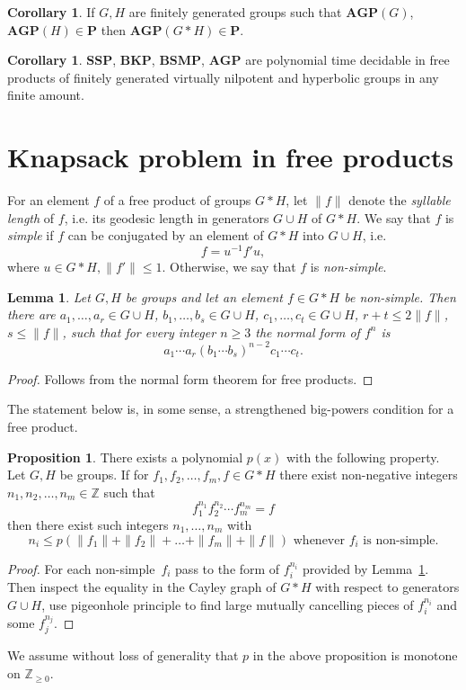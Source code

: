\documentclass[10pt]{amsart}
\newtheorem{lemma}[theorem]{Lemma}
\theoremstyle{definition}
\newtheorem{proposition}[theorem]{Proposition}
\newtheorem{corollary}[theorem]{Corollary}
\def\P{{\mathbf{P}}}
\def\SSP{{\mathbf{SSP}}}
\def\BSMP{{\mathbf{BSMP}}}
\def\BKP{{\mathbf{BKP}}}
\def\AGP{{\mathbf{AGP}}}
\def\dumb{simple} %
\def\nondumb{non-simple} %
\begin{document}
\begin{corollary}\label{cor:ptime_agp}
If $G,H$ are finitely generated groups such that $\AGP(G)$, $\AGP(H)\in\P$ then $\AGP(G*H)\in\P$.
\end{corollary}


\begin{corollary}
$\SSP$, $\BKP$, $\BSMP$, $\AGP$ are polynomial time decidable in free products of finitely generated virtually nilpotent and hyperbolic groups in any finite amount.
\end{corollary}

\section{Knapsack problem in free products}\label{sec:knapsack}
For an element $f$ of a free product of groups $G*H$, let $\|f\|$ denote the {\em syllable length} of $f$, i.e. its geodesic length in generators $G\cup H$ of $G*H$. We say that $f$ is {\em \dumb} if $f$ can be conjugated by an element of $G*H$ into $G\cup H$, i.e.
\begin{equation}\label{eq:simple}
f=u^{-1}f'u,
\end{equation}
where $u\in G*H, \|f'\|\le 1$. Otherwise, we say that $f$ is {\em \nondumb}.

\begin{lemma}\label{le:power}
Let $G,H$ be groups and let an element $f\in G\ast H$ be \nondumb.
Then there are $a_1,\ldots,a_r\in G\cup H$, $b_1,\ldots,b_s\in G\cup H$, $c_1,\ldots,c_t\in G\cup H$, $r+t\le 2\|f\|$, $s\le \|f\|$, such that for every integer $n\ge 3$ the normal form of $f^n$ is
$$
a_1\cdots a_r(b_1\cdots b_s)^{n-2}c_1\cdots c_t.
$$
\end{lemma}
\begin{proof} Follows from the normal form theorem for free products.
\end{proof}

The statement below is, in some sense, a strengthened big-powers condition for a free product.
\begin{proposition}\label{pr:big_power}
There exists a polynomial $p(x)$ with the following property. Let $G,H$ be groups. If for $f_1,f_2,\ldots, f_m, f\in G*H$ there exist non-negative integers $n_1,n_2,\ldots,n_m\in\mathbb Z$ such that
$$
f_1^{n_1}f_2^{n_2}\cdots f_m^{n_m}=f
$$
then there exist such integers $n_1,\ldots,n_m$ with
$$n_i\le p(\|f_1\|+\|f_2\|+\ldots+\|f_m\|+\|f\|)\mbox{ whenever } f_i\mbox{ is \nondumb}.
$$
\end{proposition}
\begin{proof}
For each \nondumb\ $f_i$ pass to the form of $f_i^{n_i}$ provided by Lemma~\ref{le:power}. Then inspect the equality in the Cayley graph of $G*H$ with respect to generators $G\cup H$, use pigeonhole principle to find large mutually cancelling pieces of $f_i^{n_i}$ and some $f_j^{n_j}$.
\end{proof}
We assume without loss of generality that $p$ in the above proposition is monotone on $\mathbb{Z}_{\ge 0}$.
\end{document}
